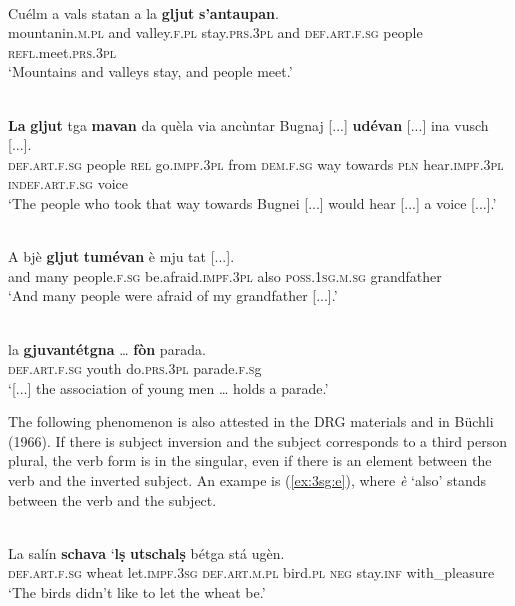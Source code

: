 \ea
\label{}
\\
\gll Cuélm a vals statan a la \textbf{gljut} \textbf{s'antaupan}.\\
mountanin.\textsc{m.pl} and valley.\textsc{f.pl} stay.\textsc{prs.3pl} and \textsc{def.art.f.sg} people \textsc{refl}.meet.\textsc{prs.3pl}\\
\glt `Mountains and valleys stay, and people meet.'
\z

\ea
\label{}
 {\citealt[142f.]{Büchli1966}}\\
\gll \textbf{La} \textbf{gljut} tga \textbf{mavan} da quèla via ancùntar Bugnaj [...] \textbf{udévan} [...] ina vusch [...].\\
\textsc{def.art.f.sg} people \textsc{rel} go.\textsc{impf.3pl} from \textsc{dem.f.sg} way towards \textsc{pln} {} hear.\textsc{impf.3pl} {} \textsc{indef.art.f.sg} voice\\
\glt `The people who took that way towards Bugnei [...] would hear [...] a voice [...].'
\z

\ea
\label{}
\\
\gll  A bjè \textbf{gljut} \textbf{tumévan} è mju tat [...].  \\
and many people.\textsc{f.sg} be.afraid.\textsc{impf.3pl} also \textsc{poss.1sg.m.sg} grandfather\\
\glt `And many people were afraid of my grandfather [...].'
\z

\ea
\label{}
\\
\gll    [...] la \textbf{gjuvantétgna} … \textbf{fòn} parada.\\
{} \textsc{def.art.f.sg} youth {} do.\textsc{prs.3pl} parade.\textsc{f.s}g\\
\glt `[...] the association of young men … holds a parade.'
\z

The following phenomenon is also attested in the DRG materials and in Büchli (1966). If there is subject inversion and the subject corresponds to a third person plural, the verb form is in the singular, even if there is an element between the verb and the inverted subject. An exampe is (\ref{ex:3sg:e}), where \textit{è} `also' stands between the verb and the subject.


\ea
\label{}
\\
\gll La salín \textbf{schava} `\textbf{lṣ} \textbf{utschalṣ} bétga stá ugèn.\\
\textsc{def.art.f.sg} wheat let.\textsc{impf.3sg} \textsc{def.art.m.pl} bird.\textsc{pl} \textsc{neg} stay.\textsc{inf} with\_pleasure\\
\glt `The birds didn't like to let the wheat be.'
\z

